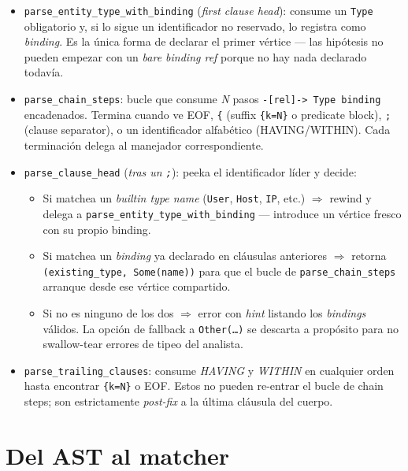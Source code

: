 \begin{itemize}
    \item \texttt{parse\_entity\_type\_with\_binding} (\emph{first
    clause head}): consume un \texttt{Type} obligatorio y, si lo
    sigue un identificador no reservado, lo registra como
    \emph{binding}. Es la única forma de declarar el primer vértice
    --- las hipótesis no pueden empezar con un \emph{bare binding ref}
    porque no hay nada declarado todavía.
    \item \texttt{parse\_chain\_steps}: bucle que consume \emph{N}
    pasos \texttt{-[rel]-> Type binding} encadenados. Termina cuando
    ve EOF, \texttt{\{} (suffix \texttt{\{k=N\}} o predicate block),
    \texttt{;} (clause separator), o un identificador
    alfabético (HAVING/WITHIN). Cada terminación delega al manejador
    correspondiente.
    \item \texttt{parse\_clause\_head} (\emph{tras un \texttt{;}}):
    peeka el identificador líder y decide:
    \begin{itemize}
        \item Si matchea un \emph{builtin type name}
        (\texttt{User}, \texttt{Host}, \texttt{IP}, etc.) $\Rightarrow$
        rewind y delega a \texttt{parse\_entity\_type\_with\_binding}
        --- introduce un vértice fresco con su propio binding.
        \item Si matchea un \emph{binding} ya declarado en cláusulas
        anteriores $\Rightarrow$ retorna
        \texttt{(existing\_type, Some(name))} para que el bucle de
        \texttt{parse\_chain\_steps} arranque desde ese vértice
        compartido.
        \item Si no es ninguno de los dos $\Rightarrow$ error con
        \emph{hint} listando los \emph{bindings} válidos. La opción
        de fallback a \texttt{Other(\dots)} se descarta a propósito
        para no swallow-tear errores de tipeo del analista.
    \end{itemize}
    \item \texttt{parse\_trailing\_clauses}: consume \emph{HAVING} y
    \emph{WITHIN} en cualquier orden hasta encontrar \texttt{\{k=N\}}
    o EOF. Estos no pueden re-entrar el bucle de chain steps; son
    estrictamente \emph{post-fix} a la última cláusula del cuerpo.
\end{itemize}

\section{Del AST al matcher}


